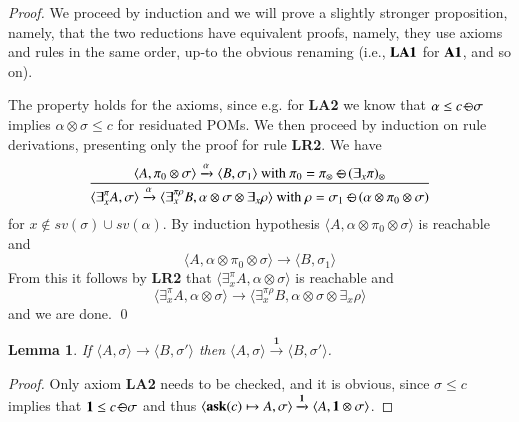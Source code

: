 \documentclass[preprint,12pt]{elsarticle}
\newtheorem{lemma}{Lemma}
\newtheorem{proof}{Proof}
\newcommand{\ask}{{\bf ask}}
\def\monid{{\mathbf 0}}
\def\odiv{\, {\ominus\hspace{-7.7pt} \div} \,}
\def\monid{\mathbf{1}}
\begin{document}
\begin{proof}
	We proceed by induction and we will prove a slightly stronger proposition, namely, that the two reductions
	have equivalent proofs, namely, they use axioms and rules in the same order,
	up-to the obvious renaming (i.e., ${\bf LA1}$ for ${\bf A1}$, and so on).
	
	The property holds for the axioms, since e.g. for {\bf LA2} we know that
	$\alpha \leq c \odiv \sigma$ implies $\alpha \otimes \sigma \leq c$ for residuated POMs.
	We then proceed by induction on rule derivations,
	presenting only the proof for rule {\bf LR2}.
	We have 
	$$\frac {\displaystyle \langle A, \pi_0 \otimes \sigma \rangle \xrightarrow{\alpha}
		\langle B, \sigma_1 \rangle \text{ with } \pi_0 = \pi_\otimes \; {\ominus\hspace{-7.5pt} \div} \; (\exists_x \pi)_\otimes }
	{\displaystyle \langle \exists^\pi_x A, \sigma \rangle \xrightarrow{\alpha}
		\langle \exists^{\pi \rho}_x B, \alpha \otimes \sigma \otimes \exists_x \rho \rangle  \text{ with } \rho = \sigma_1 \; {\ominus\hspace{-7.5pt} \div} \; (\alpha \otimes \pi_0 \otimes \sigma)}$$
	for $x \not \in sv(\sigma) \cup sv(\alpha)$.
	By induction hypothesis $\langle A, \alpha \otimes \pi_0 \otimes \sigma \rangle$ is reachable and
	$$\langle A, \alpha \otimes \pi_0 \otimes \sigma \rangle \to
	\langle B, \sigma_1 \rangle$$
	From this it follows by {\bf LR2} that $\langle \exists^\pi_x A, \alpha \otimes \sigma \rangle$ is reachable and
	$$\langle \exists^\pi_x A, \alpha \otimes \sigma \rangle \to
	\langle \exists^{\pi \rho}_x B, \alpha \otimes \sigma \otimes \exists_x \rho \rangle$$
	and we are done.
	\qed
\end{proof}

\setcounter{lemma}{11}
\begin{lemma}
	\label{idred}
	If %
	$\langle A, \sigma \rangle \to \langle B, \sigma' \rangle$
	then %
	$\langle A, \sigma \rangle \xrightarrow{\monid}  \langle B, \sigma' \rangle$.
\end{lemma}
\begin{proof}
	Only axiom  {\bf LA2} needs to be checked, and it is obvious, since $\sigma \leq c$ implies that 
	$\monid \leq c \odiv \sigma$ and thus 
	$\langle \hbox{\ask}(c) \mapsto A, \sigma \rangle \xrightarrow{\monid}
	\langle A, \monid \otimes \sigma \rangle$.
\end{proof}	
\end{document}
